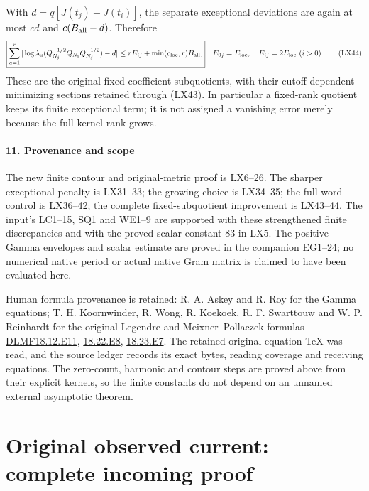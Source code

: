 \documentclass[10pt]{article}
\begin{document}
With \(d=q[J(t_j)-J(t_i)]\), the separate exceptional deviations are again at most \(c d\) and \(c(B_{\rm all}-d)\). Therefore \[
\boxed{\sum_{a=1}^r|\log\lambda_a(Q_{N_j}^{-1/2}Q_{N_i}Q_{N_j}^{-1/2})-d|
\le r E_{ij}+\min(c_{\rm loc},r)B_{\rm all},}
\quad E_{0j}=E_{\rm loc},\quad E_{ij}=2E_{\rm loc}\ (i>0).
\tag{LX44}
\] These are the original fixed coefficient subquotients, with their cutoff-dependent minimizing sections retained through (LX43). In particular a fixed-rank quotient keeps its finite exceptional term; it is not assigned a vanishing error merely because the full kernel rank grows.

\subsection{11. Provenance and scope}\label{provenance-and-scope}

The new finite contour and original-metric proof is LX6--26. The sharper exceptional penalty is LX31--33; the growing choice is LX34--35; the full word control is LX36--42; the complete fixed-subquotient improvement is LX43--44. The input's LC1--15, SQ1 and WE1--9 are supported with these strengthened finite discrepancies and with the proved scalar constant 83 in LX5. The positive Gamma envelopes and scalar estimate are proved in the companion EG1--24; no numerical native period or actual native Gram matrix is claimed to have been evaluated here.

Human formula provenance is retained: R. A. Askey and R. Roy for the Gamma equations; T. H. Koornwinder, R. Wong, R. Koekoek, R. F. Swarttouw and W. P. Reinhardt for the original Legendre and Meixner--Pollaczek formulas \href{https://dlmf.nist.gov/18.12.E11.tex}{DLMF18.12.E11}, \href{https://dlmf.nist.gov/18.22.E8.tex}{18.22.E8}, \href{https://dlmf.nist.gov/18.23.E7.tex}{18.23.E7}. The retained original equation TeX was read, and the source ledger records its exact bytes, reading coverage and receiving equations. The zero-count, harmonic and contour steps are proved above from their explicit kernels, so the finite constants do not depend on an unnamed external asymptotic theorem.

\clearpage\part{Original observed current: complete incoming proof}
\end{document}
